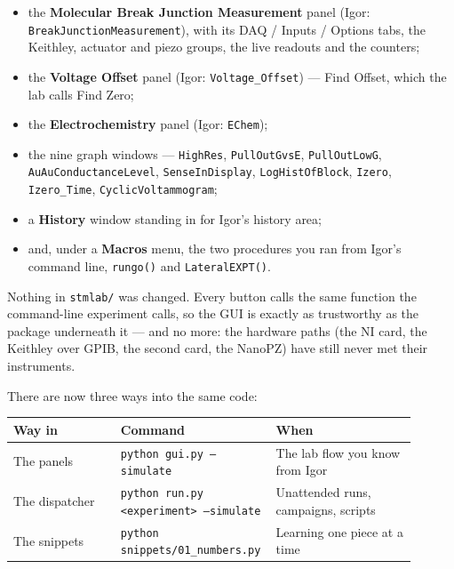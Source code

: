 \begin{itemize}[leftmargin=*]
\item the \textbf{Molecular Break Junction Measurement} panel (Igor: \texttt{Break\discretionary{}{}{}Junction\discretionary{}{}{}Measurement}), with its DAQ / Inputs / Options tabs, the Keithley, actuator and piezo groups, the live readouts and the counters;
\item the \textbf{Voltage Offset} panel (Igor: \texttt{Voltage\_\discretionary{}{}{}Offset}) --- Find Offset, which the lab calls Find Zero;
\item the \textbf{Electrochemistry} panel (Igor: \texttt{EChem});
\item the nine graph windows --- \texttt{High\discretionary{}{}{}Res}, \texttt{Pull\discretionary{}{}{}Out\discretionary{}{}{}Gvs\discretionary{}{}{}E}, \texttt{Pull\discretionary{}{}{}Out\discretionary{}{}{}Low\discretionary{}{}{}G}, \texttt{Au\discretionary{}{}{}Au\discretionary{}{}{}Conductance\discretionary{}{}{}Level}, \texttt{Sense\discretionary{}{}{}In\discretionary{}{}{}Display}, \texttt{Log\discretionary{}{}{}Hist\discretionary{}{}{}Of\discretionary{}{}{}Block}, \texttt{Izero}, \texttt{Izero\_\discretionary{}{}{}Time}, \texttt{Cyclic\discretionary{}{}{}Voltammogram};
\item a \textbf{History} window standing in for Igor's history area;
\item and, under a \textbf{Macros} menu, the two procedures you ran from Igor's command line, \texttt{rungo()} and \texttt{Lateral\discretionary{}{}{}EXPT()}.
\end{itemize}

Nothing in \texttt{stmlab/\discretionary{}{}{}} was changed. Every button calls the same function the command-line experiment calls, so the GUI is exactly as trustworthy as the package underneath it --- and no more: the hardware paths (the NI card, the Keithley over GPIB, the second card, the NanoPZ) have still never met their instruments.

There are now three ways into the same code:

\small\setlength{\LTleft}{0pt}\setlength{\LTright}{\fill}
\begin{longtable}{@{}>{\raggedright\arraybackslash}p{0.26\linewidth}>{\raggedright\arraybackslash}p{0.30\linewidth}>{\raggedright\arraybackslash}p{0.34\linewidth}@{}}
\toprule
\textbf{Way in} & \textbf{Command} & \textbf{When} \\
\midrule\endhead
The panels & \texttt{python gui.\discretionary{}{}{}py --simulate} & The lab flow you know from Igor \\
The dispatcher & \texttt{python run.\discretionary{}{}{}py <experiment> --simulate} & Unattended runs, campaigns, scripts \\
The snippets & \texttt{python snippets/\discretionary{}{}{}01\_\discretionary{}{}{}numbers.\discretionary{}{}{}py} & Learning one piece at a time \\
\bottomrule
\end{longtable}
\normalsize

